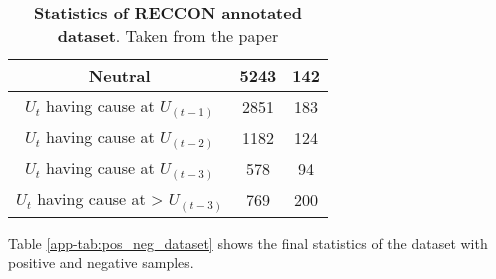 \documentclass{article}
\begin{document}
\begin{table}[!h]
{\begin{tabular}{||c|c|c||}
Neutral & 5243               & 142                \\ \hline \hline
$U_t$ having cause at $U_{(t-1)}$  & 2851               & 183                \\ \hline
$U_t$ having cause at $U_{(t-2)}$ & 1182               & 124                \\ \hline
$U_t$ having cause at $U_{(t-3)}$ & 578                & 94                 \\ \hline
$U_t$ having cause at  \textgreater{} $U_{(t-3)}$ & 769                & 200                \\ \hline
\end{tabular}
}
\vspace{1mm}
\caption{\textbf{Statistics of RECCON annotated dataset}. Taken from the paper\cite{poria2020recognizing}}
\label{app-tab:datas}
\end{table}

Table \ref{app-tab:pos_neg_dataset} shows the final statistics of the dataset with positive and negative samples.
\end{document}
